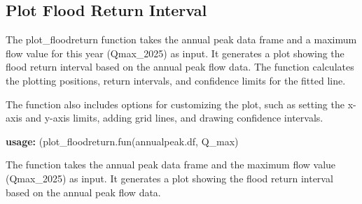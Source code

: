 \documentclass{tufte-handout}\usepackage[]{graphicx}\usepackage[]{xcolor}
\begin{document}
\subsection{Plot Flood Return Interval}

The plot\_floodreturn function takes the annual peak data frame and a maximum flow value for this year (Qmax\_2025) as input. It generates a plot showing the flood return interval based on the annual peak flow data. The function calculates the plotting positions, return intervals, and confidence limits for the fitted line.

The function also includes options for customizing the plot, such as setting the x-axis and y-axis limits, adding grid lines, and drawing confidence intervals. 

\textbf{usage:} (plot\_floodreturn.fun(annualpeak.df, Q\_max)

The function takes the annual peak data frame and the maximum flow value (Qmax\_2025) as input. It generates a plot showing the flood return interval based on the annual peak flow data. 
\end{document}

